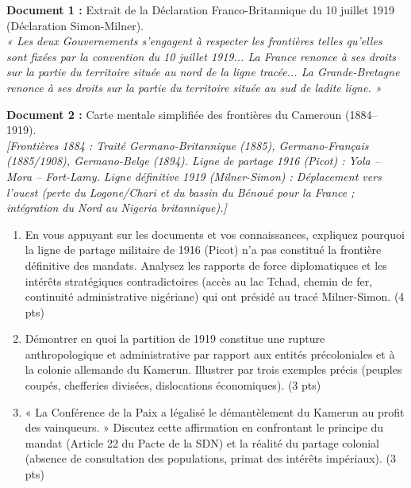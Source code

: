 \documentclass[11pt]{article}
\begin{document}
\begin{exercice}
\textbf{Document 1 :} Extrait de la Déclaration Franco-Britannique du 10 juillet 1919 (Déclaration Simon-Milner). \\
\textit{« Les deux Gouvernements s'engagent à respecter les frontières telles qu'elles sont fixées par la convention du 10 juillet 1919... La France renonce à ses droits sur la partie du territoire située au nord de la ligne tracée... La Grande-Bretagne renonce à ses droits sur la partie du territoire située au sud de ladite ligne. »}

\textbf{Document 2 :} Carte mentale simplifiée des frontières du Cameroun (1884--1919). \\
\textit{[Frontières 1884 : Traité Germano-Britannique (1885), Germano-Français (1885/1908), Germano-Belge (1894). Ligne de partage 1916 (Picot) : Yola -- Mora -- Fort-Lamy. Ligne définitive 1919 (Milner-Simon) : Déplacement vers l'ouest (perte du Logone/Chari et du bassin du Bénoué pour la France ; intégration du Nord au Nigeria britannique).]}

\begin{enumerate}
    \item En vous appuyant sur les documents et vos connaissances, expliquez pourquoi la ligne de partage militaire de 1916 (Picot) n'a pas constitué la frontière définitive des mandats. Analysez les rapports de force diplomatiques et les intérêts stratégiques contradictoires (accès au lac Tchad, chemin de fer, continuité administrative nigériane) qui ont présidé au tracé Milner-Simon. (4 pts)
    \item Démontrer en quoi la partition de 1919 constitue une rupture anthropologique et administrative par rapport aux entités précoloniales et à la colonie allemande du Kamerun. Illustrer par trois exemples précis (peuples coupés, chefferies divisées, dislocations économiques). (3 pts)
    \item « La Conférence de la Paix a légalisé le démantèlement du Kamerun au profit des vainqueurs. » Discutez cette affirmation en confrontant le principe du mandat (Article 22 du Pacte de la SDN) et la réalité du partage colonial (absence de consultation des populations, primat des intérêts impériaux). (3 pts)
\end{enumerate}
\end{exercice}
\end{document}
